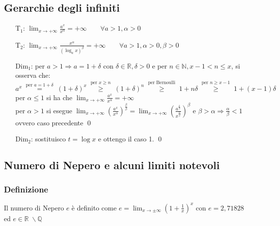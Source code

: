 \documentclass[a4paper]{article}
\begin{document}
\subsection{Gerarchie degli infiniti}
\begin{itemize}
	\item[T\(_1\):] \(\displaystyle \lim_{x \to + \infty} \frac{a^x}{x^\alpha} = + \infty \qquad \forall a > 1, \alpha > 0\)
	\item[T\(_2\):] \(\displaystyle \lim_{x \to + \infty} \frac{x^\alpha}{\left( \log_a x \right) ^ \beta} = + \infty \qquad \forall a > 1, \alpha > 0, \beta > 0\)
	\item[Dim\(_1\):] per \(a > 1 \Rightarrow a = 1 + \delta\) con \(\delta \in \mathbb{R}, \delta > 0\) e per \(n \in \mathbb{N}, x-1 < n \leq x\), si osserva che: \\
	\(a^x \; \stackrel{\text{per }a=1+\delta}{=} \; (1 + \delta)^x \; \stackrel{\text{per }x \geq n}{\geq} \; (1 + \delta)^n \; \stackrel{\text{per Bernoulli}}{\geq} \; 1 + n \delta \; \stackrel{\text{per } n \geq x-1}{\geq} \; 1 + (x-1) \delta\) \\
	per \(\alpha \leq 1\) si ha che \(\displaystyle \lim_{x \to + \infty} \frac{a^x}{x^\alpha} = + \infty\) \\
	per \(\alpha > 1\) si esegue \(\displaystyle \lim_{x \to + \infty} \left(\frac{a^x}{x^\alpha}\right)^\frac{\beta}{\beta} = \lim_{x \to + \infty} \left(\frac{a^\frac{x}{\beta}}{x^\frac{\alpha}{\beta}}\right)^\beta\)
	e \(\displaystyle \beta > \alpha \Rightarrow \frac{\alpha}{\beta} < 1\) ovvero caso precedente \qed
	\item[Dim\(_2\):] sostituisco \(t = \log x\) e ottengo il caso 1. \qed
\end{itemize}

\newpage

\subsection{Numero di Nepero e alcuni limiti notevoli}
\subsubsection*{Definizione}
Il numero di Nepero \(e\) è definito come \(\displaystyle e = \lim_{x \to \pm \infty} \left( 1 + \frac{1}{x} \right) ^ x\)
con \(e = 2,71828\) ed \(e \in \mathbb{R} \; \backslash \mathbb{Q}\)
\end{document}
